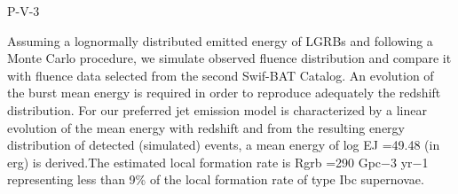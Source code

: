P-V-3


\bigskip



\bigskip

\noindent Assuming a lognormally distributed emitted energy of LGRBs and following a Monte Carlo procedure, we simulate observed fluence distribution and compare it with fluence data selected from the second Swif-BAT Catalog. An evolution of the burst mean energy is required in order to reproduce adequately the redshift distribution.
For our preferred jet emission model is characterized by a linear evolution of the mean energy with redshift and from the resulting energy distribution of detected (simulated) events, a mean energy of log EJ =49.48 (in erg) is derived.The estimated local formation rate is Rgrb =290 Gpc−3 yr−1 representing less than 9\% of the local formation rate of type Ibc supernovae.

